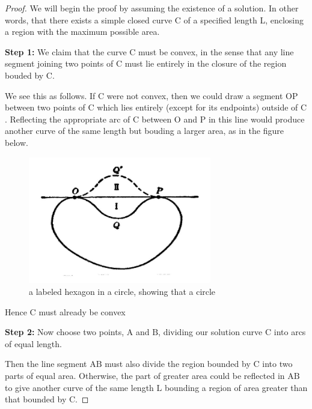 \documentclass[a4paper]{book}
\numberwithin{theorem}{section}%
\begin{document}
\begin{proof} 
    We will begin the proof by assuming the existence of a solution. In other words, that there exists a simple closed curve $\mathrm{C}$ of a specified length L, enclosing a region with the maximum possible area.

    \textbf{Step 1:} We claim that the curve $\mathrm{C}$ must be convex, in the sense that any line segment joining two points of $\mathrm{C}$ must lie entirely in the closure of the region bouded by $\mathrm{C}$.

    We see this as follows. If $\mathrm{C}$ were not convex, then we could draw a segment $\mathrm{OP}$ between two points of $\mathrm{C}$ which lies entirely (except for its endpoints) outside of $\mathrm{C}$. Reflecting the appropriate arc of $\mathrm{C}$ between $\mathrm{O}$ and $\mathrm{P}$ in this line would produce another curve of the same length but bouding a larger area, as in the figure below.
    \begin{figure}[hbt!]
        \begin{center}   
            \includegraphics[width=80mm]{steiner1}
            \caption{a labeled hexagon in a circle, showing that a circle }
        \end{center}
    \end{figure}\leavevmode
    Hence $\mathrm{C}$ must already be convex

    \textbf{Step 2:} Now choose  two points, $\mathrm{A}$ and $\mathrm{B}$, dividing our solution curve $\mathrm{C}$ into arcs of equal length.

    Then the line segment $\mathrm{AB}$ must also divide the region bounded by $\mathrm{C}$ into two parts of equal area. Otherwise, the part of greater area could be reflected in $\mathrm{AB}$ to give another curve of the same length $\mathrm{L}$ bounding a region of area greater than that bounded by $\mathrm{C}$. 


\end{proof}
\end{document}

